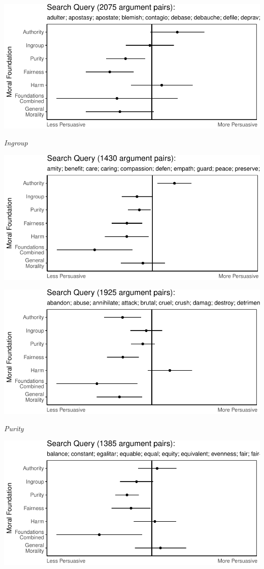 \documentclass[11pt,]{article}
\begin{document}
\includegraphics{prelim_files/figure-latex/unnamed-chunk-6-1.pdf}

\emph{Ingroup}

\includegraphics{prelim_files/figure-latex/unnamed-chunk-7-1.pdf}

\includegraphics{prelim_files/figure-latex/unnamed-chunk-8-1.pdf}

\emph{Purity}

\includegraphics{prelim_files/figure-latex/unnamed-chunk-9-1.pdf}
\end{document}
